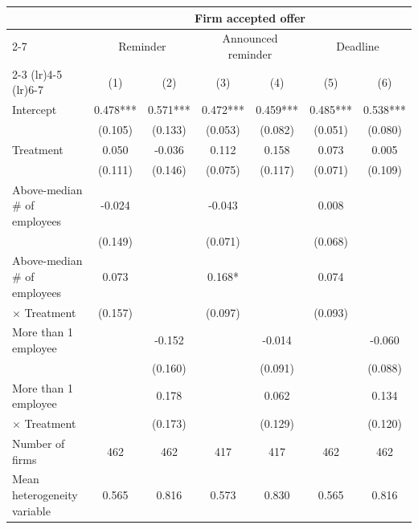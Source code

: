 \begin{tabular}{lcccccc}
\toprule
 & \multicolumn{6}{c}{Firm accepted offer} \\
\cmidrule(lr){2-7}
\multicolumn{1}{r}{Treatment:} & \multicolumn{2}{c}{Reminder} & \multicolumn{2}{c}{Announced reminder} & \multicolumn{2}{c}{Deadline} \\
\cmidrule(lr){2-3} \cmidrule(lr){4-5} \cmidrule(lr){6-7}
 & (1) & (2) & (3) & (4) & (5) & (6) \\
\midrule
Intercept & 0.478*** & 0.571*** & 0.472*** & 0.459*** & 0.485*** & 0.538*** \\ & (0.105) & (0.133) & (0.053) & (0.082) & (0.051) & (0.080) \\
Treatment & 0.050 & -0.036 & 0.112 & 0.158 & 0.073 & 0.005 \\ & (0.111) & (0.146) & (0.075) & (0.117) & (0.071) & (0.109) \\
Above-median \# of employees & -0.024 &  & -0.043 &  & 0.008 &  \\ & (0.149) &  & (0.071) &  & (0.068) \\
Above-median \# of employees & 0.073 &  & 0.168* &  & 0.074 &   \\
\hspace{1em} $\times$ Treatment & (0.157) &  & (0.097) &  & (0.093)  \\
More than 1 employee &  & -0.152 &  & -0.014 &  & -0.060 \\ &  & (0.160) &  & (0.091) &  & (0.088) \\
More than 1 employee &  & 0.178 &  & 0.062 &  & 0.134  \\
\hspace{1em} $\times$ Treatment &  & (0.173) &  & (0.129) &  & (0.120)  \\
\midrule
Number of firms & 462 & 462 & 417 & 417 & 462 & 462 \\
Mean heterogeneity variable & 0.565 & 0.816 & 0.573 & 0.830 & 0.565 & 0.816 \\
\bottomrule
\end{tabular}
